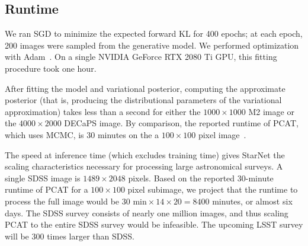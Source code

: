




\subsection{Runtime}
\label{sec:runtime}
We ran SGD to minimize the expected forward KL
for 400 epochs; at each epoch, 200 images were sampled from the generative model.
We performed optimization with Adam~\citep{kingma2014adam}.
On a single NVIDIA GeForce RTX 2080 Ti GPU,
this fitting procedure took one hour.

After fitting the model and variational posterior,
computing the approximate posterior
(that is, producing the distributional parameters of the variational approximation) takes less than a second for either the $1000\times1000$ M2 image
or the $4000 \times 2000$ DECaPS image. 
By comparison, the reported runtime of PCAT, which uses MCMC, is 30 minutes on the a $100 \times 100$ pixel image~\citep{Feder_2019}.

The speed at inference time (which excludes training time) gives StarNet the scaling characteristics necessary for processing large astronomical surveys.
A single SDSS image is $1489 \times 2048$ pixels.
Based on the reported 30-minute runtime of PCAT for a $100\times100$ pixel subimage, we project that
the runtime to process the full image would be $30\text{ min} \times 14 \times 20 = 8400$ minutes, or almost six days.
The SDSS survey consists of nearly one million images, and thus scaling PCAT to the entire SDSS survey would be infeasible.
The upcoming LSST survey will be 300 times larger than SDSS.


